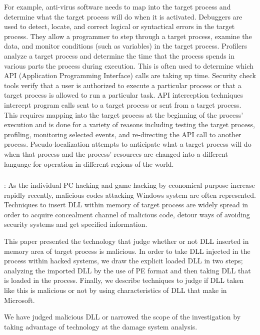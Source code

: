 \documentclass{article}
\begin{document}
For example, anti-virus software needs to map into the target process and determine what the target process will do when it is activated. Debuggers are used to detect, locate, and correct logical or syntactical errors in the target process. They allow a programmer to step through a target process, examine the data, and monitor conditions (such as variables) in the target process. Profilers analyze a target process and determine the time that the process spends in various parts the process during execution. This is often used to determine which API (Application Programming Interface) calls are taking up time. Security check tools verify that a user is authorized to execute a particular process or that a target process is allowed to run a particular task. API interception techniques intercept program calls sent to a target process or sent from a target process. This requires mapping into the target process at the beginning of the process' execution and is done for a variety of reasons including testing the target process, profiling, monitoring selected events, and re-directing the API call to another process. Pseudo-localization attempts to anticipate what a target process will do when that process and the process' resources are changed into a different language for operation in different regions of the world.


\subsubsection{\textcite{Jang:2007}}
\textbf{}: As the individual PC hacking and game hacking by economical purpose increase rapidly recently, malicious codes attacking Windows system are often represented. Techniques to insert DLL within memory of target process are widely spread in order to acquire concealment channel of malicious code, detour ways of avoiding security systems and get specified information.

This paper presented the technology that judge whether or not DLL inserted in memory area of target process is malicious. In order to take DLL injected in the process within hacked systems, we draw the explicit loaded DLL in two steps; analyzing the imported DLL by the use of PE format and then taking DLL that is loaded in the process. Finally, we describe techniques to judge if DLL taken like this is malicious or not by using characteristics of DLL that make in Microsoft.

We have judged malicious DLL or narrowed the scope of the investigation by taking advantage of technology at the damage system analysis.
\end{document}

